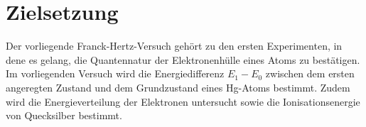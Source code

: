 \section{Zielsetzung}
\label{sec:Zielsetzung}
Der vorliegende Franck-Hertz-Versuch gehört zu den ersten Experimenten, in dene es gelang, die Quantennatur der Elektronenhülle eines Atoms zu bestätigen.
Im vorliegenden Versuch wird die Energiedifferenz $E_1-E_0$ zwischen dem ersten angeregten Zustand und dem Grundzustand eines Hg-Atoms bestimmt.
Zudem wird die Energieverteilung der Elektronen untersucht sowie die Ionisationsenergie von Quecksilber bestimmt.
